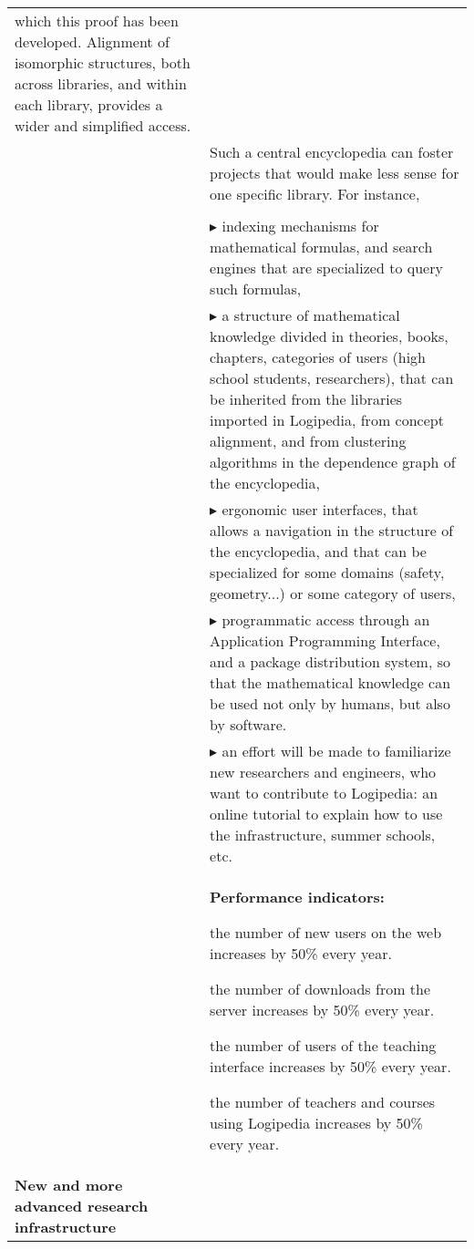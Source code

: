 \begin{longtable}{|p{}|p{}|}
which this
proof has been developed.  Alignment of isomorphic structures, both
across libraries, and
within each library, provides a wider and simplified access.\\
&
\hspace{0.4cm}
Such a central encyclopedia can foster
projects that would make less sense for one specific library. For instance,\\
\\
&
$\blacktriangleright$
indexing mechanisms for mathematical formulas, and search engines
  that are specialized to query such formulas,
\\
&
$\blacktriangleright$
a structure of mathematical knowledge divided in theories, books,
    chapters, categories of users (high school students, researchers),
    that can be inherited from the libraries imported in
      Logipedia, from concept alignment, and from clustering
    algorithms in the dependence graph of the encyclopedia,
\\
&
$\blacktriangleright$
  ergonomic user interfaces, that allows a navigation in the
    structure of the encyclopedia, and that can be specialized for
    some domains (safety, geometry...) or some category of users,
\\
&
$\blacktriangleright$ programmatic access through an Application Programming
    Interface, and a package distribution system, so that the
    mathematical knowledge can be used not only by humans, but also by
    software.
\\
&
$\blacktriangleright$
an effort will be made to familiarize new researchers and engineers,
who want to contribute to Logipedia:
an online tutorial to explain how to use the infrastructure,
summer schools, etc.
\\
&
\colorbox{color2}{\bf Performance indicators:}
\begin{compactitem}
\item the number of new users on the web increases
  by 50\% every year.
\item the number of downloads from the server
  increases by 50\% every year.
\item the number of users of the teaching interface 
  increases by 50\% every year.
\item the number of teachers and courses using Logipedia
  increases by 50\% every year.
\end{compactitem}
\\
\hline
{\bf New and more advanced research infrastructure}

\end{longtable}
